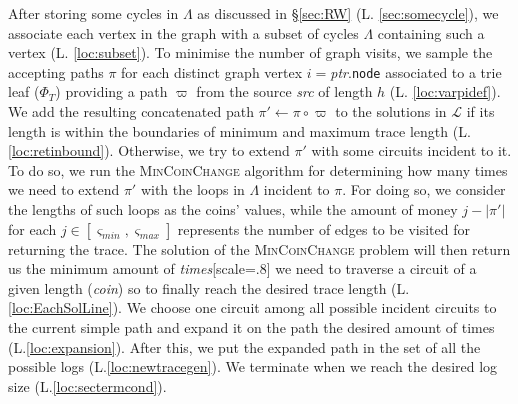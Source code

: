 \documentclass[sigconf]{acmart}
\newcommand{\smin}{\ensuremath{\varsigma_\textit{min}}}
\newcommand{\smax}{\ensuremath{\varsigma_\textit{max}}}
\begin{document}
After storing some cycles in $\Lambda$ as discussed in \S\ref{sec:RW} (L. \ref{sec:somecycle}), we associate each vertex in the graph with a subset of cycles $\Lambda$ containing such a vertex (L. \ref{loc:subset}). To minimise the number of graph visits, we sample the accepting paths $\pi$ for each distinct graph vertex $i=$\textit{ptr}.\texttt{node} associated to a trie leaf ($\Phi_T$) providing a path $\varpi$ from the source \textit{src} of length $h$ (L. \ref{loc:varpidef}). We add the resulting  concatenated path $\pi'\gets\pi\circ\varpi$ to the solutions in $\mathcal{L}$ if its length is within the boundaries of minimum and maximum trace length (L. \ref{loc:retinbound}). Otherwise, we try to extend $\pi'$ with some circuits incident to it. To do so, we run the \textsc{MinCoinChange} algorithm for determining how many times we need to extend $\pi'$ with the loops in $\Lambda$ incident to $\pi$. For doing so, we consider the lengths of such loops as the coins' values, while the amount of money $j-|\pi'|$  for each $j\in [\smin,\smax]$ represents the number of edges to be visited for returning the trace. The solution of the \textsc{MinCoinChange} problem will then return us the minimum amount of \textit{times}[scale=.8] we need to traverse a circuit of a given length (\textit{coin}) so to finally reach the desired trace length (L.\ref{loc:EachSolLine}). We choose one circuit among all possible incident circuits to the current simple path and expand it on the path the desired amount of times (L.\ref{loc:expansion}). After this, we put the expanded path in the set of all the possible logs (L.\ref{loc:newtracegen}). We terminate when we reach the desired log size (L.\ref{loc:sectermcond}).

 
\end{document}
